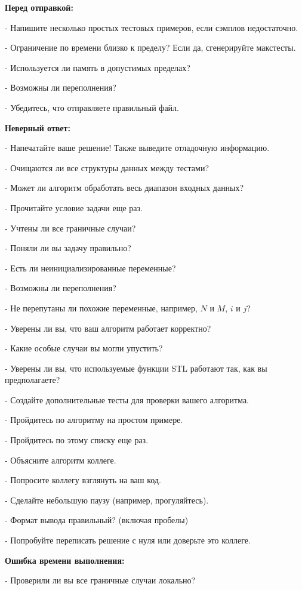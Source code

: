 \textbf{Перед отправкой:}  

- Напишите несколько простых тестовых примеров, если сэмплов недостаточно.  

- Ограничение по времени близко к пределу? Если да, сгенерируйте макстесты.  

- Используется ли память в допустимых пределах?  

- Возможны ли переполнения?  

- Убедитесь, что отправляете правильный файл.  


\textbf{Неверный ответ:}  

- Напечатайте ваше решение! Также выведите отладочную информацию.  

- Очищаются ли все структуры данных между тестами?  

- Может ли алгоритм обработать весь диапазон входных данных?  

- Прочитайте условие задачи еще раз.  

- Учтены ли все граничные случаи?  

- Поняли ли вы задачу правильно?  

- Есть ли неинициализированные переменные?  

- Возможны ли переполнения?  

- Не перепутаны ли похожие переменные, например, $N$ и $M$, $i$ и $j$?  

- Уверены ли вы, что ваш алгоритм работает корректно?  

- Какие особые случаи вы могли упустить?  

- Уверены ли вы, что используемые функции STL работают так, как вы предполагаете?  

- Создайте дополнительные тесты для проверки вашего алгоритма.  

- Пройдитесь по алгоритму на простом примере.  

- Пройдитесь по этому списку еще раз.  

- Объясните алгоритм коллеге.  

- Попросите коллегу взглянуть на ваш код.  

- Сделайте небольшую паузу (например, прогуляйтесь).  

- Формат вывода правильный? (включая пробелы)  

- Попробуйте переписать решение с нуля или доверьте это коллеге.  


\textbf{Ошибка времени выполнения:}  

- Проверили ли вы все граничные случаи локально?  


